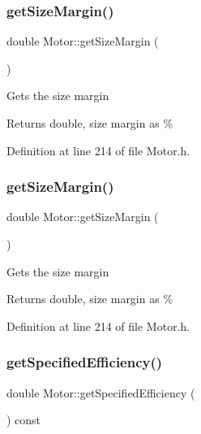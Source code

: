 \subsubsection{\texorpdfstring{get\+Size\+Margin()}{getSizeMargin()}\hspace{0.1cm}{\footnotesize\ttfamily [2/3]}}
{\footnotesize\ttfamily double Motor\+::get\+Size\+Margin (\begin{DoxyParamCaption}{ }\end{DoxyParamCaption})\hspace{0.3cm}{\ttfamily [inline]}}

Gets the size margin

\begin{DoxyReturn}{Returns}
double, size margin as \% 
\end{DoxyReturn}


Definition at line 214 of file Motor.\+h.

\mbox{\label{class_motor_aff485f55bed5b58d1454ce5c71bc0729}} 
\subsubsection{\texorpdfstring{get\+Size\+Margin()}{getSizeMargin()}\hspace{0.1cm}{\footnotesize\ttfamily [3/3]}}
{\footnotesize\ttfamily double Motor\+::get\+Size\+Margin (\begin{DoxyParamCaption}{ }\end{DoxyParamCaption})\hspace{0.3cm}{\ttfamily [inline]}}

Gets the size margin

\begin{DoxyReturn}{Returns}
double, size margin as \% 
\end{DoxyReturn}


Definition at line 214 of file Motor.\+h.

\mbox{\label{class_motor_aca202d3c2061bd8c19e1819331033e36}} 
\subsubsection{\texorpdfstring{get\+Specified\+Efficiency()}{getSpecifiedEfficiency()}\hspace{0.1cm}{\footnotesize\ttfamily [1/3]}}
{\footnotesize\ttfamily double Motor\+::get\+Specified\+Efficiency (\begin{DoxyParamCaption}{ }\end{DoxyParamCaption}) const\hspace{0.3cm}{\ttfamily [inline]}}

